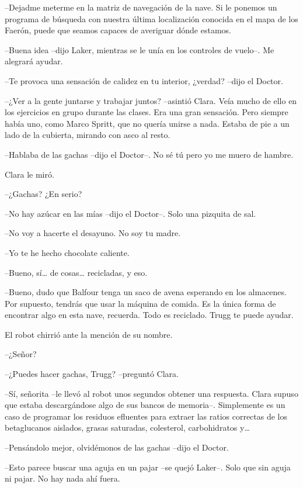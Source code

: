 {--Dejadme meterme en la matriz de navegación de la nave. Si le ponemos
 un programa de búsqueda con nuestra última localización conocida en el
 mapa de los Faerón, puede que seamos capaces de averiguar dónde
estamos.}

{--Buena idea --dijo Laker, mientras se le unía en los controles de
vuelo--. Me alegrará ayudar.}

{--Te provoca una sensación de calidez en tu interior, ¿verdad? --dijo el
Doctor.}

{--¿Ver a la gente juntarse y trabajar juntos? --asintió Clara. Veía
 mucho de ello en los ejercicios en grupo durante las clases. Era una
 gran sensación. Pero siempre había uno, como Marco Spritt, que no quería
 unirse a nada. Estaba de pie a un lado de la cubierta, mirando con asco
al resto.}

{--Hablaba de las gachas --dijo el Doctor--. No sé tú pero yo me muero de
hambre.}

{Clara le miró.}

{--¿Gachas? ¿En serio?}

{--No hay azúcar en las mías --dijo el Doctor--. Solo una pizquita de
sal.}

{--No voy a hacerte el desayuno. No soy tu madre.}

{--Yo te he hecho chocolate caliente.}

{--Bueno, sí\ldots{} de cosas\ldots{} recicladas, y eso.}

{--Bueno, dudo que Balfour tenga un saco de avena esperando en los
 almacenes. Por supuesto, tendrás que usar la máquina de comida. Es la
 única forma de encontrar algo en esta nave, recuerda. Todo es reciclado.
Trugg te puede ayudar.}

{El robot chirrió ante la mención de su nombre.}

{--¿Señor?}

{--¿Puedes hacer gachas, Trugg? --preguntó Clara.}

{--Sí, señorita --le llevó al robot unos segundos obtener una respuesta.
 Clara supuso que estaba descargándose algo de sus bancos de memoria--.
 Simplemente es un caso de programar los residuos efluentes para extraer
 las ratios correctas de los betaglucanos aislados, grasas saturadas,
 colesterol, carbohidratos y\ldots{}}

{--Pensándolo mejor, olvidémonos de las gachas --dijo el
 Doctor.}

{--Esto parece buscar una aguja en un pajar --se
quejó Laker--. Solo que sin aguja ni pajar. No hay nada ahí fuera.}

